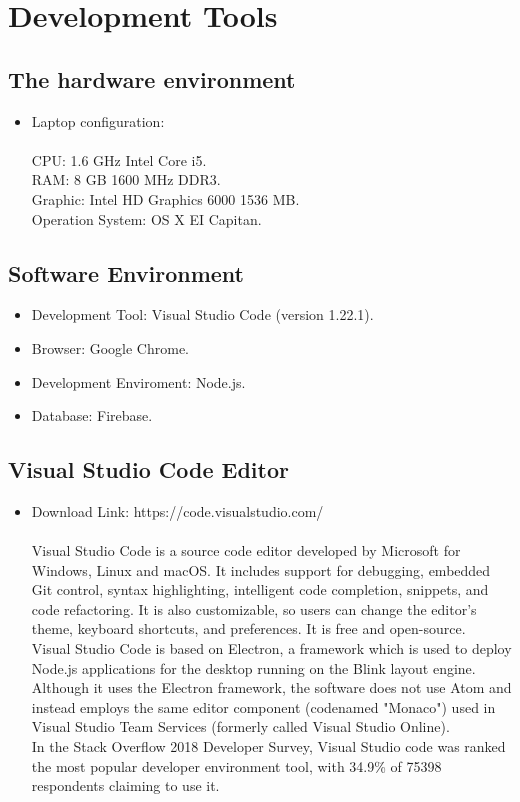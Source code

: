 \section{Development Tools}
\subsection{The hardware environment}
\begin{itemize}
\item Laptop configuration: \\ \\ CPU: 1.6 GHz Intel Core i5. \\ RAM: 8 GB 1600 MHz DDR3. \\ Graphic: Intel HD Graphics 6000 1536 MB. \\ Operation System: OS X EI Capitan.
\end{itemize}

\subsection{Software Environment}
\begin{itemize}
\item Development Tool: Visual Studio Code (version 1.22.1).
\item Browser: Google Chrome.
\item Development Enviroment: Node.js.
\item Database: Firebase.
\end{itemize}

\subsection{Visual Studio Code Editor}
\begin{itemize}
\item Download Link: https://code.visualstudio.com/ \\ \\ Visual Studio Code is a source code editor developed by Microsoft for Windows, Linux and macOS. It includes support for debugging, embedded Git control, syntax highlighting, intelligent code completion, snippets, and code refactoring. It is also customizable, so users can change the editor's theme, keyboard shortcuts, and preferences. It is free and open-source.\cite{1} \\ Visual Studio Code is based on Electron, a framework which is used to deploy Node.js applications for the desktop running on the Blink layout engine. Although it uses the Electron framework, the software does not use Atom and instead employs the same editor component (codenamed "Monaco") used in Visual Studio Team Services (formerly called Visual Studio Online).\cite{1} \\ In the Stack Overflow 2018 Developer Survey, Visual Studio code was ranked the most popular developer environment tool, with 34.9\% of 75398 respondents claiming to use it.\cite{1}
\end{itemize}

